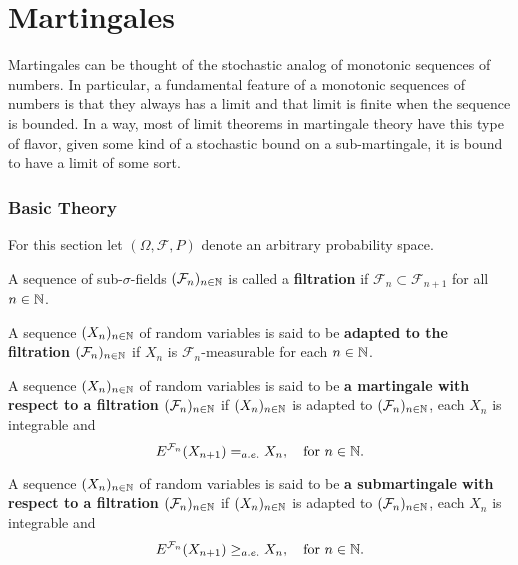 

\part{Martingales}

Martingales can be thought of the stochastic analog of monotonic sequences of numbers. In particular,  a fundamental feature of a monotonic sequences of numbers is that they always has a limit and that limit is finite when the sequence is bounded. In a way, most of limit theorems in martingale theory have this type of flavor, given some kind of a stochastic bound on a sub-martingale, it is bound to have  a limit of some sort.


%
%
\section{Basic Theory}


\begin{sectionassumption}
For this section let $(\Omega, \mathcal F, P)$ denote an arbitrary probability space.
\end{sectionassumption}

\begin{definition}
A sequence of sub-$\sigma$-fields $(\mathcal F_n)_{n\in\Bbb N}$ is called a {\bf filtration} if $\mathcal F_n\subset \mathcal F_{n+1}$ for all $n\in\Bbb N$.
\end{definition}

\begin{definition}
A sequence $(X_n)_{n\in\Bbb N}$ of random variables is said to be {\bf adapted to the filtration $(\mathcal F_n)_{n\in\Bbb N}$} if $X_n$ is $\mathcal F_n$-measurable for each $n\in \Bbb N$.
\end{definition}

\begin{definition}
A sequence $(X_n)_{n\in\Bbb N}$ of random variables is said to be {\bf a martingale with respect to a filtration $(\mathcal F_n)_{n\in\Bbb N}$} if $(X_n)_{n\in\Bbb N}$ is adapted to $(\mathcal F_n)_{n\in\Bbb N}$, each $X_n$ is integrable and
\[  E^{\mathcal F_n}(X_{n+1})=_{\tiny a.e.} X_n ,\quad\text{for $n\in \Bbb N$}. \]
\end{definition}



\begin{definition}
A sequence $(X_n)_{n\in\Bbb N}$ of random variables is said to be {\bf a submartingale with respect to a filtration $(\mathcal F_n)_{n\in\Bbb N}$} if $(X_n)_{n\in\Bbb N}$ is adapted to $(\mathcal F_n)_{n\in\Bbb N}$, each $X_n$ is integrable and
\[ E^{\mathcal F_n} (X_{n+1})  \geq_{\tiny a.e.} X_n,\quad\text{for $n\in \Bbb N$}. \]
\end{definition}



